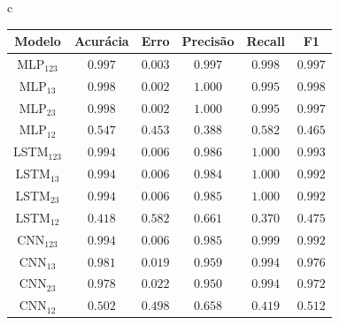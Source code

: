 \begin{table}
	\begin{tabular}{c}
		\\
		\begin{minipage}{0.45\textwidth}
			\label{tab:metricas10Mbps}
			\begin{tabular*}{\textwidth}{@{} CCCCCC@{} }
				\toprule
				Modelo&Acurácia&Erro&Precisão&Recall&F1 \\
				\midrule
				MLP$_{123}$ & $0.997$ & $0.003$ & $0.997$ & $0.998$ & $0.997$ \\
				MLP$_{13}$ & $0.998$ & $0.002$ & $1.000$ & $0.995$ & $0.998$ \\
				MLP$_{23}$ & $0.998$ & $0.002$ & $1.000$ & $0.995$ & $0.997$ \\
				MLP$_{12}$ & $0.547$ & $0.453$ & $0.388$ & $0.582$ & $0.465$ \\
				LSTM$_{123}$ & $0.994$ & $0.006$ & $0.986$ & $1.000$ & $0.993$ \\
				LSTM$_{13}$ & $0.994$ & $0.006$ & $0.984$ & $1.000$ & $0.992$ \\
				LSTM$_{23}$ & $0.994$ & $0.006$ & $0.985$ & $1.000$ & $0.992$ \\
				LSTM$_{12}$ & $0.418$ & $0.582$ & $0.661$ & $0.370$ & $0.475$ \\
				CNN$_{123}$ & $0.994$ & $0.006$ & $0.985$ & $0.999$ & $0.992$ \\
				CNN$_{13}$ & $0.981$ & $0.019$ & $0.959$ & $0.994$ & $0.976$ \\
				CNN$_{23}$ & $0.978$ & $0.022$ & $0.950$ & $0.994$ & $0.972$ \\
				CNN$_{12}$ & $0.502$ & $0.498$ & $0.658$ & $0.419$ & $0.512$ \\    		
				\bottomrule
			\end{tabular*}
			
			
			
		\end{minipage}
		

\end{tabular}
\end{table}
